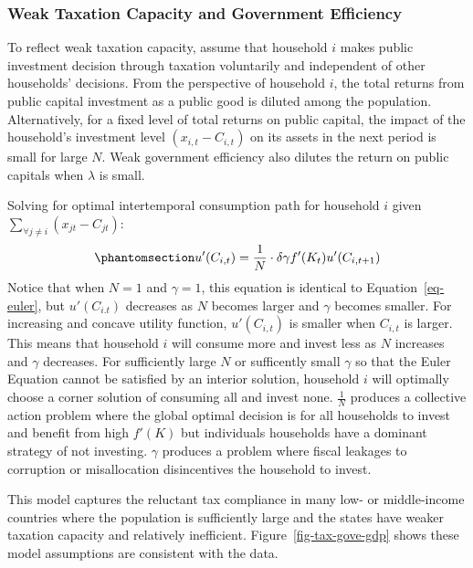 \documentclass[
  11pt]{article}
\begin{document}
\subsubsection*{Weak Taxation Capacity and Government
Efficiency}\label{weak-taxation-capacity-and-government-efficiency}

To reflect weak taxation capacity, assume that household \(i\) makes
public investment decision through taxation voluntarily and independent
of other households' decisions. From the perspective of household \(i\),
the total returns from public capital investment as a public good is
diluted among the population. Alternatively, for a fixed level of total
returns on public capital, the impact of the household's investment
level \((x_{i,t} - C_{i,t})\) on its assets in the next period is small
for large \(N\). Weak government efficiency also dilutes the return on
public capitals when \(\lambda\) is small.

Solving for optimal intertemporal consumption path for household \(i\)
given
\(\sum_{\forall j\ne i} (x_{jt} - C_{jt})\):\begin{equation}\phantomsection\label{eq-euler-public}{
u'(C_{i,t}) = \frac{1}{N} \cdot \delta \gamma f'(K_t) u'(C_{i, t+1})
}\end{equation} Notice that when \(N=1\) and \(\gamma = 1\), this
equation is identical to Equation~\ref{eq-euler}, but \(u'(C_{i.t})\)
decreases as \(N\) becomes larger and \(\gamma\) becomes smaller. For
increasing and concave utility function, \(u'(C_{i,t})\) is smaller when
\(C_{i,t}\) is larger. This means that household \(i\) will consume more
and invest less as \(N\) increases and \(\gamma\) decreases. For
sufficiently large \(N\) or sufficently small \(\gamma\) so that the
Euler Equation cannot be satisfied by an interior solution, household
\(i\) will optimally choose a corner solution of consuming all and
invest none. \(\frac{1}{N}\) produces a collective action problem where
the global optimal decision is for all households to invest and benefit
from high \(f'(K)\) but individuals households have a dominant strategy
of not investing. \(\gamma\) produces a problem where fiscal leakages to
corruption or misallocation disincentives the household to invest.

This model captures the reluctant tax compliance in many low- or
middle-income countries where the population is sufficiently large and
the states have weaker taxation capacity and relatively inefficient.
Figure~\ref{fig-tax-gove-gdp} shows these model assumptions are
consistent with the data.
\end{document}
